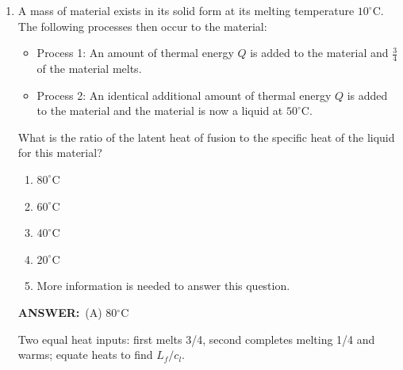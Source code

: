 \documentclass[12pt, a4paper]{article}
\makeatletter
\newcommand{\finalanswer}[1]{\textbf{ANSWER:}~#1}
\newif\if@categoryprinted
\newcommand{\category}[1]{\if@categoryprinted\relax\else\textit{\textcolor{gray}{Category: #1}}\global\@categoryprintedtrue\fi}
\makeatother
\begin{document}
\begin{CJK*}{UTF8}{gbsn}
\begin{enumerate}[itemsep=1.0em, topsep=0.6em]
\category{Waves \& Sound}
\begin{answerbox}
\finalanswer{(C) 659.6 Hz}
\end{answerbox}
\begin{insightbox}
Closed-tube resonances are spaced by $\lambda/2$; determine $\lambda$ from the difference in lengths and compute $f=v/\lambda$.
\end{insightbox}
\begin{solutionbox}

For a closed tube, successive resonances differ by $\Delta L = \tfrac{\lambda}{2}$. In this case $\Delta L = 0.65\,\text{m} - 0.39\,\text{m} = 0.26\,\text{m}$, so $\lambda = 2\times 0.26 = 0.52\,\text{m}$. The frequency is
\[
 f = \frac{v}{\lambda} = \frac{343\,\text{m/s}}{0.52\,\text{m}} \approx 659.6\,\text{Hz}.
\]
\\
\emph{Model:} closed–open tube has harmonics $L=(2n-1)\lambda/4$, so successive $L$ differ by $\lambda/2$.
\end{solutionbox}

\item \label{prob:4}
A mass of material exists in its solid form at its melting temperature $10^\circ$C. The following processes then occur to the material:
\begin{itemize}
    \item Process 1: An amount of thermal energy $Q$ is added to the material and $\tfrac{3}{4}$ of the material melts.
    \item Process 2: An identical additional amount of thermal energy $Q$ is added to the material and the material is now a liquid at $50^\circ$C.
\end{itemize}
What is the ratio of the latent heat of fusion to the specific heat of the liquid for this material?
\begin{enumerate}[label=(\Alph*)]
    \item $80^\circ$C
    \item $60^\circ$C
    \item $40^\circ$C
    \item $20^\circ$C
    \item More information is needed to answer this question.
\end{enumerate}

\category{Thermodynamics \& Phase Change}
\begin{answerbox}
\finalanswer{(A) 80$^{\circ}$C}
\end{answerbox}
\begin{insightbox}
Two equal heat inputs: first melts 3/4, second completes melting 1/4 and warms; equate heats to find $L_f/c_l$.
\end{insightbox}
\begin{solutionbox}


\end{solutionbox}
\end{enumerate}
\end{CJK*}
\end{document}
